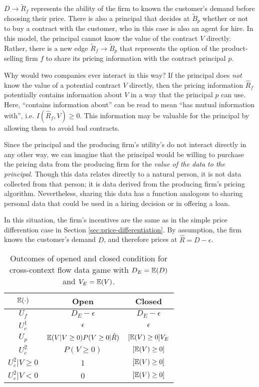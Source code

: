 \documentclass[../thesis.tex]{subfiles}
\begin{document}
$D \rightarrow \tilde{R}_f$ represents the ability of
the firm to known the customer's demand before choosing their
price.
There is also a principal that decides at $\tilde{B}_p$
whether or not to buy a contract with the customer, who
in this case is also an agent for hire.
In this model, the principal cannot know the value
of the contract $V$ directly.
Rather, there is a new edge $\tilde{R}_f \rightarrow \tilde{B}_p$
that represents
the option of the product-selling firm $f$ to share its
pricing information with the contract principal $p$.

Why would two companies ever interact in this way?
If the principal does \emph{not} know the value of
a potential contract $V$ directly, then the pricing
information $\hat{R}_f$ potentially contains information
about $V$ in a way that the principal $p$ can use.
Here, ``contains information about'' can be read to
mean ``has mutual information with'', i.e.
$I(\hat{R}_f, V) \geq 0$.
This information may be valuable for the principal
by allowing them to avoid bad contracts.

Since the principal and the producing firm's utility's
do not interact directly in any other way, we can
imagine that the principal would be willing to
purchase the pricing data from the producing firm
for the \emph{value of the data to the principal}.
Though this data relates directly to
a natural person, it is not data collected from that
person; it is data derived from the producing firm's
pricing algorithm.
Nevertheless, sharing this data has a function analogous
to sharing personal data that could be used in a hiring decision
or in offering a loan.

In this situation, the firm's incentives are the same
as in the simple price differention
case in Section \ref{sec:price-differentiation}.
By assumption, the firm knows the customer's demand
$D$, and therefore prices at $\hat{R} = D - \epsilon$.

\begin{table}
\begin{center}
\begin{tabular}{ |c|c|c| } 
 \hline
  $\mathbb{E}(\cdot)$ & Open & Closed  \\
 \hline
 $U_f$ & $D_E - \epsilon$ & $D_E - \epsilon$ \\
 $U^1_c$ & $\epsilon$ & $\epsilon$ \\
 $U_p$ & $\mathbb{E}(V \vert V \geq 0) P(V \geq 0 \vert \hat{R})$ & $[\mathbb{E}(V) \geq 0] V_E$  \\
 $U_c^2$ & $P(V \geq 0)$ & $[\mathbb{E}(V) \geq 0]$  \\
 $U_c^2 \vert V \geq 0$ & $1$ & $[\mathbb{E}(V) \geq 0]$  \\
 $U_c^2 \vert V < 0$ & $0$ & $[\mathbb{E}(V) \geq 0]$  \\
 \hline
\end{tabular}
\end{center}
\caption{Outcomes of opened and closed condition for cross-context flow data game with $D_E = \mathbb{E}(D)$ and $V_E = \mathbb{E}(V)$.}
\end{table}
\end{document}

